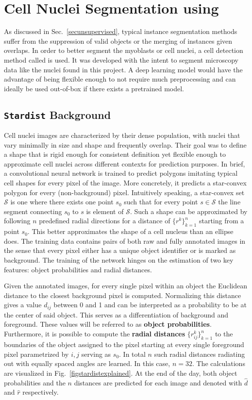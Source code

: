 \section{Cell Nuclei Segmentation using \stardist}\label{secstardist}
As discussed in Sec.~\ref{secunsupervised}, typical instance segmentation methods suffer from the suppression of valid objects or the merging of instances given overlaps. In order to better segment the myoblasts or cell nuclei, a cell detection method called \stardist \cite{schmidt2018, weigert2020} is used. It was developed with the intent to segment microscopy data like the nuclei found in this project. A deep learning model would have the advantage of being flexible enough to not require much preprocessing and can ideally be used out-of-box if there exists a pretrained model.
\subsection{\texttt{Stardist} Background}
Cell nuclei images are characterized by their dense population, with nuclei that vary minimally in size and shape and frequently overlap. Their goal was to define a shape that is rigid enough for consistent definition yet flexible enough to approximate cell nuclei across different contexts for prediction purposes. In brief, a convolutional neural network is trained to predict polygons imitating typical cell shapes for every pixel of the image. More concretely, it predicts a star-convex polygon for every (non-background) pixel. Intuitively speaking, a star-convex set $\mathcal{S}$ is one where there exists one point $s_{0}$ such that for every point $s \in \mathcal{S}$ the line segment connecting $s_{0}$ to $s$ is element of $\mathcal{S}$. Such a shape can be approximated by following $n$ predefined radial directions for a distance of $\{r^{k}\}^{n}_{k = 1}$ starting from a point $s_{0}$. This better approximates the shape of a cell nucleus than an ellipse does. The training data contains pairs of both raw and fully annotated images in the sense that every pixel either has a unique object identifier or is marked as background. The training of the network hinges on the estimation of two key features: object probabilities and radial distances.

Given the annotated images, for every single pixel within an object the Euclidean distance to the closest background pixel is computed. Normalizing this distance gives a value $d_{ij}$ between 0 and 1 and can be interpreted as a probability to be at the center of said object. This serves as a differentiation of background and foreground. These values will be referred to as \textbf{object probabilities}. Furthermore, it is possible to compute the \textbf{radial distances} $\{r^{k}_{ij}\}^{n}_{k = 1}$ to the boundaries of the object assigned to the pixel  starting at every single foreground pixel parametrized by $i, j$ serving as $s_{0}$. In total $n$ such radial distances radiating out with equally spaced angles are learned. In this case, $n = 32$. The calculations are visualized in Fig.~\ref{figstardistexplained}. At the end of the day, both object probabilities and the $n$ distances are predicted for each image and denoted with $\hat{d}$ and $\hat{r}$ respectively. 

